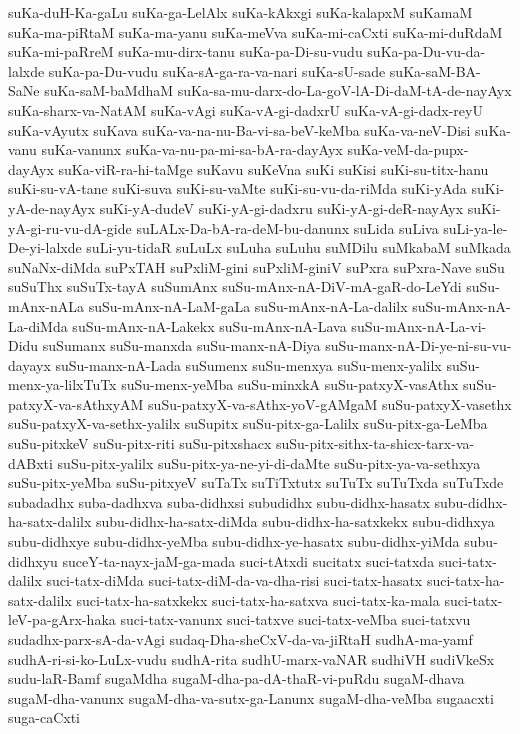 {suKa-duH-Ka-gaLu
suKa-ga-LelAlx
suKa-kAkxgi
suKa-kalapxM
suKamaM
suKa-ma-piRtaM
suKa-ma-yanu
suKa-meVva
suKa-mi-caCxti
suKa-mi-duRdaM
suKa-mi-paRreM
suKa-mu-dirx-tanu
suKa-pa-Di-su-vudu
suKa-pa-Du-vu-da-lalxde
suKa-pa-Du-vudu
suKa-sA-ga-ra-va-nari
suKa-sU-sade
suKa-saM-BA-SaNe
suKa-saM-baMdhaM
suKa-sa-mu-darx-do-La-goV-lA-Di-daM-tA-de-nayAyx
suKa-sharx-va-NatAM
suKa-vAgi
suKa-vA-gi-dadxrU
suKa-vA-gi-dadx-reyU
suKa-vAyutx
suKava
suKa-va-na-nu-Ba-vi-sa-beV-keMba
suKa-va-neV-Disi
suKa-vanu
suKa-vanunx
suKa-va-nu-pa-mi-sa-bA-ra-dayAyx
suKa-veM-da-pupx-dayAyx
suKa-viR-ra-hi-taMge
suKavu
suKeVna
suKi
suKisi
suKi-su-titx-hanu
suKi-su-vA-tane
suKi-suva
suKi-su-vaMte
suKi-su-vu-da-riMda
suKi-yAda
suKi-yA-de-nayAyx
suKi-yA-dudeV
suKi-yA-gi-dadxru
suKi-yA-gi-deR-nayAyx
suKi-yA-gi-ru-vu-dA-gide
suLALx-Da-bA-ra-deM-bu-danunx
suLida
suLiva
suLi-ya-le-De-yi-lalxde
suLi-yu-tidaR
suLuLx
suLuha
suLuhu
suMDilu
suMkabaM
suMkada
suNaNx-diMda
suPxTAH
suPxliM-gini
suPxliM-giniV
suPxra
suPxra-Nave
suSu
suSuThx
suSuTx-tayA
suSumAnx
suSu-mAnx-nA-DiV-mA-gaR-do-LeYdi
suSu-mAnx-nALa
suSu-mAnx-nA-LaM-gaLa
suSu-mAnx-nA-La-dalilx
suSu-mAnx-nA-La-diMda
suSu-mAnx-nA-Lakekx
suSu-mAnx-nA-Lava
suSu-mAnx-nA-La-vi-Didu
suSumanx
suSu-manxda
suSu-manx-nA-Diya
suSu-manx-nA-Di-ye-ni-su-vu-dayayx
suSu-manx-nA-Lada
suSumenx
suSu-menxya
suSu-menx-yalilx
suSu-menx-ya-lilxTuTx
suSu-menx-yeMba
suSu-minxkA
suSu-patxyX-vasAthx
suSu-patxyX-va-sAthxyAM
suSu-patxyX-va-sAthx-yoV-gAMgaM
suSu-patxyX-vasethx
suSu-patxyX-va-sethx-yalilx
suSupitx
suSu-pitx-ga-Lalilx
suSu-pitx-ga-LeMba
suSu-pitxkeV
suSu-pitx-riti
suSu-pitxshacx
suSu-pitx-sithx-ta-shicx-tarx-va-dABxti
suSu-pitx-yalilx
suSu-pitx-ya-ne-yi-di-daMte
suSu-pitx-ya-va-sethxya
suSu-pitx-yeMba
suSu-pitxyeV
suTaTx
suTiTxtutx
suTuTx
suTuTxda
suTuTxde
subadadhx
suba-dadhxva
suba-didhxsi
subudidhx
subu-didhx-hasatx
subu-didhx-ha-satx-dalilx
subu-didhx-ha-satx-diMda
subu-didhx-ha-satxkekx
subu-didhxya
subu-didhxye
subu-didhx-yeMba
subu-didhx-ye-hasatx
subu-didhx-yiMda
subu-didhxyu
suceY-ta-nayx-jaM-ga-mada
suci-tAtxdi
sucitatx
suci-tatxda
suci-tatx-dalilx
suci-tatx-diMda
suci-tatx-diM-da-va-dha-risi
suci-tatx-hasatx
suci-tatx-ha-satx-dalilx
suci-tatx-ha-satxkekx
suci-tatx-ha-satxva
suci-tatx-ka-mala
suci-tatx-leV-pa-gArx-haka
suci-tatx-vanunx
suci-tatxve
suci-tatx-veMba
suci-tatxvu
sudadhx-parx-sA-da-vAgi
sudaq-Dha-sheCxV-da-va-jiRtaH
sudhA-ma-yamf
sudhA-ri-si-ko-LuLx-vudu
sudhA-rita
sudhU-marx-vaNAR
sudhiVH
sudiVkeSx
sudu-laR-Bamf
sugaMdha
sugaM-dha-pa-dA-thaR-vi-puRdu
sugaM-dhava
sugaM-dha-vanunx
sugaM-dha-va-sutx-ga-Lanunx
sugaM-dha-veMba
sugaacxti
suga-caCxti
}
